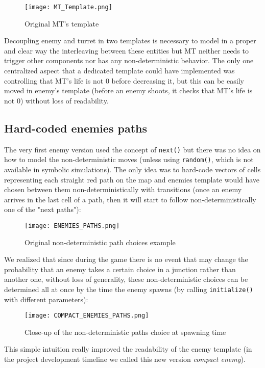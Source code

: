 \documentclass[
10pt, %
a4paper, %
oneside, %
headinclude,footinclude, %
BCOR5mm, %
]{scrartcl}
\begin{document}
			\begin{figure}[h!]
				\centering
				\texttt{[image: MT\_Template.png]}
				\caption{Original MT's template}
			\end{figure}
			
			Decoupling enemy and turret in two templates is necessary to model in a proper and clear way the interleaving between these entities but MT neither needs to trigger other components nor has any non-deterministic behavior. The only one centralized aspect that a dedicated template could have implemented was controlling that MT's life is not $0$ before decreasing it, but this can be easily moved in enemy's template (before an enemy shoots, it checks that MT's life is not $0$) without loss of readability.
		\subsection{Hard-coded enemies paths}
			The very first enemy version used the concept of \texttt{next()} but there was no idea on how to model the non-deterministic moves (unless using \texttt{random()}, which is not available in symbolic simulations). The only idea was to hard-code vectors of cells representing each straight red path on the map and enemies template would have chosen between them non-deterministically with transitions (once an enemy arrives in the last cell of a path, then it will start to follow non-deterministically one of the "next paths"):
			
			\begin{figure}[h!]
				\centering
				\texttt{[image: ENEMIES\_PATHS.png]}
				\caption{Original non-deterministic path choices example}
			\end{figure}
			We realized that since during the game there is no event that may change the probability that an enemy takes a certain choice in a junction rather than another one, without loss of generality, these non-deterministic choices can be determined all at once by the time the enemy spawns (by calling \texttt{initialize()} with different parameters):
			\begin{figure}[h!]
				\centering
				\texttt{[image: COMPACT\_ENEMIES\_PATHS.png]}
				\caption{Close-up of the non-deterministic paths choice at spawning time}
			\end{figure}
			This simple intuition really improved the readability of the enemy template (in the project development timeline we called this new version \emph{compact enemy}).
\end{document}
